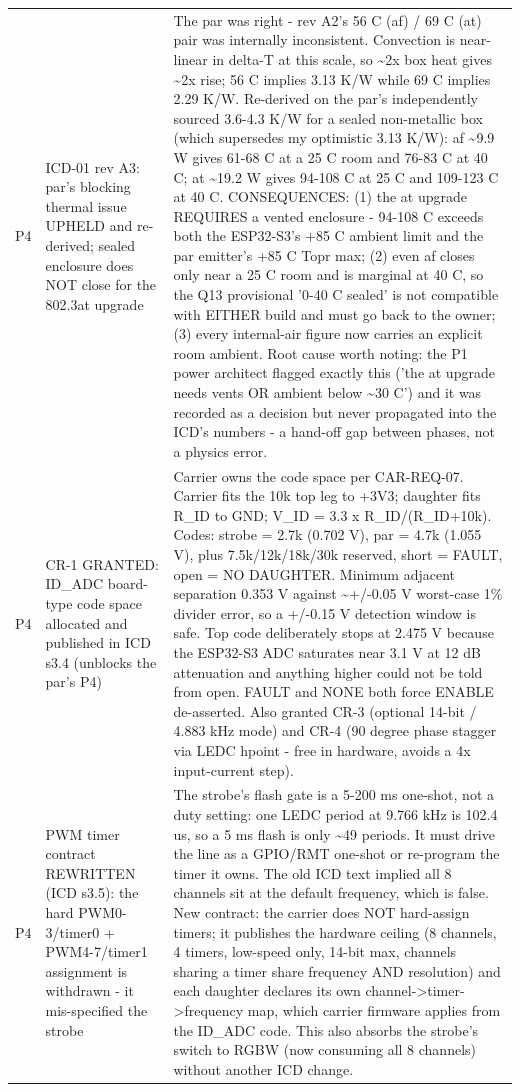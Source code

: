 \documentclass[11pt,a4paper]{article}
\begin{document}
{\begin{longtable}{lp{5.2cm}p{7.2cm}}
P4 & ICD-01 rev A3: par's blocking thermal issue UPHELD and re-derived; sealed enclosure does NOT close for the 802.3at upgrade & The par was right - rev A2's 56 C (af) / 69 C (at) pair was internally inconsistent. Convection is near-linear in delta-T at this scale, so \textasciitilde{}2x box heat gives \textasciitilde{}2x rise; 56 C implies 3.13 K/W while 69 C implies 2.29 K/W. Re-derived on the par's independently sourced 3.6-4.3 K/W for a sealed non-metallic box (which supersedes my optimistic 3.13 K/W): af \textasciitilde{}9.9 W gives 61-68 C at a 25 C room and 76-83 C at 40 C; at \textasciitilde{}19.2 W gives 94-108 C at 25 C and 109-123 C at 40 C. CONSEQUENCES: (1) the at upgrade REQUIRES a vented enclosure - 94-108 C exceeds both the ESP32-S3's +85 C ambient limit and the par emitter's +85 C Topr max; (2) even af closes only near a 25 C room and is marginal at 40 C, so the Q13 provisional '0-40 C sealed' is not compatible with EITHER build and must go back to the owner; (3) every internal-air figure now carries an explicit room ambient. Root cause worth noting: the P1 power architect flagged exactly this ('the at upgrade needs vents OR ambient below \textasciitilde{}30 C') and it was recorded as a decision but never propagated into the ICD's numbers - a hand-off gap between phases, not a physics error. \\
P4 & CR-1 GRANTED: ID\_ADC board-type code space allocated and published in ICD s3.4 (unblocks the par's P4) & Carrier owns the code space per CAR-REQ-07. Carrier fits the 10k top leg to +3V3; daughter fits R\_ID to GND; V\_ID = 3.3 x R\_ID/(R\_ID+10k). Codes: strobe = 2.7k (0.702 V), par = 4.7k (1.055 V), plus 7.5k/12k/18k/30k reserved, short = FAULT, open = NO DAUGHTER. Minimum adjacent separation 0.353 V against \textasciitilde{}+/-0.05 V worst-case 1\% divider error, so a +/-0.15 V detection window is safe. Top code deliberately stops at 2.475 V because the ESP32-S3 ADC saturates near 3.1 V at 12 dB attenuation and anything higher could not be told from open. FAULT and NONE both force ENABLE de-asserted. Also granted CR-3 (optional 14-bit / 4.883 kHz mode) and CR-4 (90 degree phase stagger via LEDC hpoint - free in hardware, avoids a 4x input-current step). \\
P4 & PWM timer contract REWRITTEN (ICD s3.5): the hard PWM0-3/timer0 + PWM4-7/timer1 assignment is withdrawn - it mis-specified the strobe & The strobe's flash gate is a 5-200 ms one-shot, not a duty setting: one LEDC period at 9.766 kHz is 102.4 us, so a 5 ms flash is only \textasciitilde{}49 periods. It must drive the line as a GPIO/RMT one-shot or re-program the timer it owns. The old ICD text implied all 8 channels sit at the default frequency, which is false. New contract: the carrier does NOT hard-assign timers; it publishes the hardware ceiling (8 channels, 4 timers, low-speed only, 14-bit max, channels sharing a timer share frequency AND resolution) and each daughter declares its own channel-\textgreater{}timer-\textgreater{}frequency map, which carrier firmware applies from the ID\_ADC code. This also absorbs the strobe's switch to RGBW (now consuming all 8 channels) without another ICD change. \\

\end{longtable}}
\end{document}
